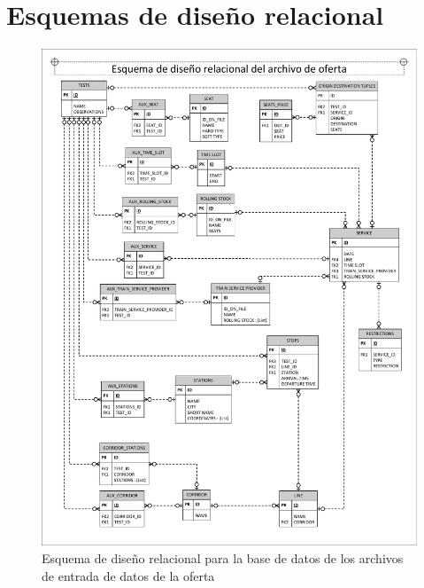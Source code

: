 \chapter{Esquemas de diseño relacional}
\label{ch:edrApendix}

\begin{figure}[H]
\centering
\includegraphics[width=1\textwidth]{fig/Bases de datos/EDR oferta V3.pdf}
\caption{Esquema de diseño relacional para la base de datos de los archivos de entrada de datos de la oferta}
\label{fig:edrOferta}
\end{figure}

